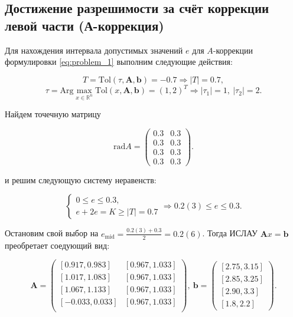 \documentclass{article}
\begin{document}
  \subsection{Достижение разрешимости за счёт коррекции левой части
  (А-коррекция)}

  Для нахождения интервала допустимых значений \( e \) для
  \( A \)-коррекции формулировки \ref{eq:problem_1} выполним следующие
  действия:

  \begin{equation*}
    T = \text{Tol}(\tau, \mathbf{A}, \mathbf{b}) = -0.7 \Rightarrow |T| = 0.7,
  \end{equation*}
  \begin{equation*}
    \tau = \text{Arg} \max_{x \in \mathbb{R}^n}
    \text{Tol}(x, \mathbf{A}, \mathbf{b}) = (1, 2)^T \Rightarrow
    |\tau_1| = 1, \ |\tau_2| = 2.
  \end{equation*}

  Найдем точечную матрицу

  \begin{equation*}
    \text{rad} A = \begin{pmatrix}
      0.3 & 0.3 \\
      0.3 & 0.3 \\
      0.3 & 0.3 \\
      0.3 & 0.3
    \end{pmatrix}.
  \end{equation*}

  и решим следующую систему неравенств:

  \begin{equation*}
    \begin{cases}
      0 \leqslant e \leqslant 0.3, \\
      e + 2e = K \geqslant |T| = 0.7
    \end{cases} \Rightarrow 0.2(3) \leqslant e \leqslant 0.3.
  \end{equation*}

  Остановим свой выбор на
  \( e_{\text{mid}} = \frac{0.2(3) + 0.3}{2} = 0.2(6) \). Тогда ИСЛАУ
  \( \mathbf{A}x = \mathbf{b} \) преобретает соедующий вид:

  \begin{equation*}
    \mathbf{A} = \begin{pmatrix}
      [0.917, 0.983] & [0.967, 1.033] \\
      [1.017, 1.083] & [0.967, 1.033] \\
      [1.067, 1.133] & [0.967, 1.033] \\
      [-0.033, 0.033] & [0.967, 1.033] \\
    \end{pmatrix}, \
    \mathbf{b} = \begin{pmatrix}
      [2.75, 3.15] \\
      [2.85, 3.25] \\
      [2.90, 3.3] \\
      [1.8, 2.2]
    \end{pmatrix}.
  \end{equation*}
\end{document}
